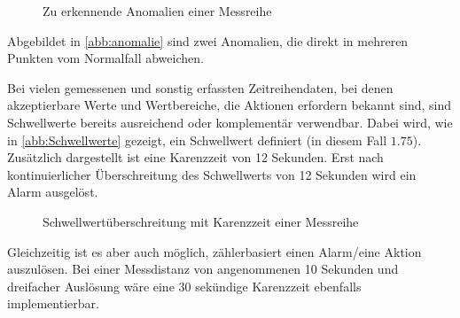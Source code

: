 \begin{figure}[H]
\centering
{}
\caption{Zu erkennende Anomalien einer Messreihe}
\label{abb:anomalie}
\end{figure}
Abgebildet in \autoref{abb:anomalie} sind zwei Anomalien, die direkt in mehreren Punkten vom Normalfall abweichen.

\label{chap:schwellwert}
Bei vielen gemessenen und sonstig erfassten Zeitreihendaten, bei denen akzeptierbare Werte und Wertbereiche, die Aktionen erfordern bekannt sind, sind Schwellwerte bereits ausreichend oder komplementär verwendbar. Dabei wird, wie in \autoref{abb:Schwellwerte} gezeigt, ein Schwellwert definiert (in diesem Fall $1.75$). Zusätzlich dargestellt ist eine Karenzzeit von 12 Sekunden. Erst nach kontinuierlicher Überschreitung des Schwellwerts von 12 Sekunden wird ein Alarm ausgelöst. 
\begin{figure}[H]
\centering
{}
\caption{Schwellwertüberschreitung mit Karenzzeit einer Messreihe}
\label{abb:Schwellwerte}
\end{figure}
Gleichzeitig ist es aber auch möglich, zählerbasiert einen Alarm/eine Aktion auszulösen. Bei einer Messdistanz von angenommenen 10 Sekunden und dreifacher Auslösung wäre eine 30 sekündige Karenzzeit ebenfalls implementierbar.

